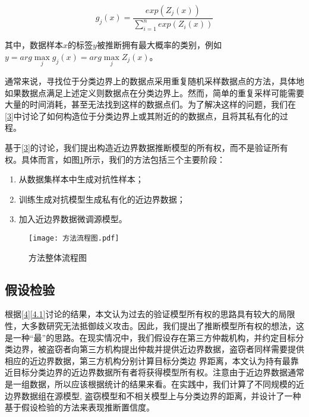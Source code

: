 \begin{equation}
	g_j(x) = \frac{exp(Z_j(x))}{\sum_{i = 1}^n exp(Z_i(x))}
\end{equation}

\noindent 其中，数据样本$x$的标签$y$被推断拥有最大概率的类别，例如$y = arg \mathop{max} \limits_j g_j(x) = arg \mathop{max} \limits_j Z_j(x)$。



通常来说，寻找位于分类边界上的数据点采用重复随机采样数据点的方法，具体地如果数据点满足上述定义则数据点在分类边界上。然而，简单的重复采样可能需要大量的时间消耗，甚至无法找到这样的数据点们。为了解决这样的问题，我们在\ref{3}中讨论了如何构造位于分类边界上或其附近的的数据点，且将其私有化的过程。

基于\ref{3}的讨论，我们提出构造近边界数据推断模型的所有权，而不是验证所有权。具体而言，如图\ref{方法流程图}所示，我们的方法包括三个主要阶段：
\begin{enumerate}
	\renewcommand{\labelenumi}{\theenumi)}
	\item 从数据集样本中生成对抗性样本；
	\item 训练生成对抗模型生成私有化的近边界数据；
	\item 加入近边界数据微调源模型。
\end{enumerate}

\begin{figure}[htbp]%
	\centering
	\texttt{[image: 方法流程图.pdf]}
	\setlength{\abovecaptionskip}{5mm} %
	\caption{方法整体流程图}
	\label{方法流程图}
\end {figure}

\subsection{假设检验}\label{4.2.3}

根据\ref{4}\ref{4.1}讨论的结果，本文认为过去的验证模型所有权的思路具有较大的局限性，大多数研究无法抵御歧义攻击。因此，我们提出了推断模型所有权的想法，这是一种“最”的思路。在现实情况中，我们假设存在第三方仲裁机构，并约定目标分类边界，被盗窃者向第三方机构提出仲裁并提供近边界数据，盗窃者同样需要提供相应的近边界数据，第三方机构分别计算目标分类边
界距离，本文认为持有最靠近目标分类边界的近边界数据所有者将获得模型所有权。注意由于近边界数据通常是一组数据，所以应该根据统计的结果来看。在实践中，我们计算了不同规模的近边界数据组在源模型, 盗窃模型和不相关模型上与分类边界的距离，并设计了一种基于假设检验的方法来表现推断置信度。

